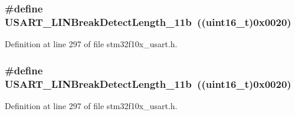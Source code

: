 \subsubsection[{\texorpdfstring{U\+S\+A\+R\+T\+\_\+\+L\+I\+N\+Break\+Detect\+Length\+\_\+11b}{USART_LINBreakDetectLength_11b}}]{\setlength{\rightskip}{0pt plus 5cm}\#define U\+S\+A\+R\+T\+\_\+\+L\+I\+N\+Break\+Detect\+Length\+\_\+11b~(({\bf uint16\+\_\+t})0x0020)}\hypertarget{group___u_s_a_r_t___l_i_n___break___detection___length_gaf591cfcc859d67d71e6fa594eb5aec16}{}\label{group___u_s_a_r_t___l_i_n___break___detection___length_gaf591cfcc859d67d71e6fa594eb5aec16}


Definition at line 297 of file stm32f10x\+\_\+usart.\+h.

\subsubsection[{\texorpdfstring{U\+S\+A\+R\+T\+\_\+\+L\+I\+N\+Break\+Detect\+Length\+\_\+11b}{USART_LINBreakDetectLength_11b}}]{\setlength{\rightskip}{0pt plus 5cm}\#define U\+S\+A\+R\+T\+\_\+\+L\+I\+N\+Break\+Detect\+Length\+\_\+11b~(({\bf uint16\+\_\+t})0x0020)}\hypertarget{group___u_s_a_r_t___l_i_n___break___detection___length_gaf591cfcc859d67d71e6fa594eb5aec16}{}\label{group___u_s_a_r_t___l_i_n___break___detection___length_gaf591cfcc859d67d71e6fa594eb5aec16}


Definition at line 297 of file stm32f10x\+\_\+usart.\+h.

